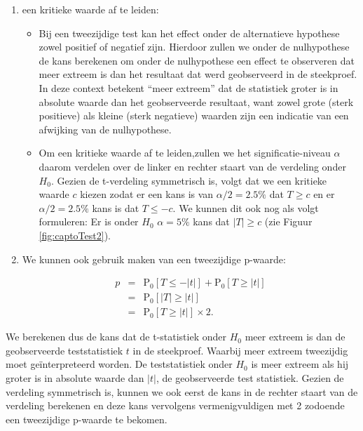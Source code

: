 \documentclass[12pt,dutch,coursenotes]{book}
\providecommand{\tightlist}{%
  \setlength{\itemsep}{0pt}\setlength{\parskip}{0pt}}
\theoremstyle{definition}
\theoremstyle{definition}
\theoremstyle{definition}
\theoremstyle{remark}
\begin{document}
\begin{enumerate}
\def\labelenumi{\arabic{enumi}.}
\tightlist
\item
  een kritieke waarde af te leiden:

  \begin{itemize}
  \tightlist
  \item
    Bij een tweezijdige test kan het effect onder de alternatieve
    hypothese zowel positief of negatief zijn. Hierdoor zullen we onder
    de nulhypothese de kans berekenen om onder de nulhypothese een
    effect te observeren dat meer extreem is dan het resultaat dat werd
    geobserveerd in de steekproef. In deze context betekent ``meer
    extreem'' dat de statistiek groter is in absolute waarde dan het
    geobserveerde resultaat, want zowel grote (sterk positieve) als
    kleine (sterk negatieve) waarden zijn een indicatie van een
    afwijking van de nulhypothese.
  \item
    Om een kritieke waarde af te leiden,zullen we het
    significatie-niveau \(\alpha\) daarom verdelen over de linker en
    rechter staart van de verdeling onder \(H_0\). Gezien de t-verdeling
    symmetrisch is, volgt dat we een kritieke waarde \(c\) kiezen zodat
    er een kans is van \(\alpha/2=2.5\%\) dat \(T\geq c\) en er
    \(\alpha/2=2.5\%\) kans is dat \(T\leq -c\). We kunnen dit ook nog
    als volgt formuleren: Er is onder \(H_0\) \(\alpha=5\%\) kans dat
    \(\vert T\vert\geq c\) (zie Figuur \ref{fig:captoTest2}).
  \end{itemize}
\item
  We kunnen ook gebruik maken van een tweezijdige p-waarde:

  \begin{eqnarray*}
    p&=&\text{P}_0\left[T\leq -|t|\right] + \text{P}_0\left[T\geq |t|\right]\\
    &=&\text{P}_0\left[\vert T\vert \geq \vert t \vert\right]\\
    &=&\text{P}_0\left[T \geq \vert t \vert\right]\times 2.
    \end{eqnarray*}
\end{enumerate}

We berekenen dus de kans dat de t-statistiek onder \(H_0\) meer extreem
is dan de geobserveerde teststatistiek \(t\) in de steekproef. Waarbij
meer extreem tweezijdig moet geïnterpreteerd worden. De teststatistiek
onder \(H_0\) is meer extreem als hij groter is in absolute waarde dan
\(\vert t \vert\), de geobserveerde test statistiek. Gezien de verdeling
symmetrisch is, kunnen we ook eerst de kans in de rechter staart van de
verdeling berekenen en deze kans vervolgens vermenigvuldigen met 2
zodoende een tweezijdige p-waarde te bekomen.
\end{document}
